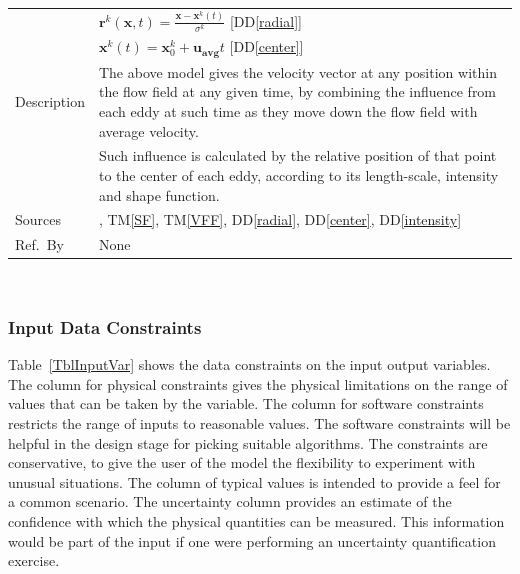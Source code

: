 \documentclass[12pt]{article}
\newcommand{\colAwidth}{0.13\textwidth}
\newcommand{\colBwidth}{0.82\textwidth}
\newcommand{\ddref}[1]{DD\ref{#1}}
\newcommand{\tref}[1]{TM\ref{#1}}
\begin{document}
\begin{minipage}{\textwidth}
\begin{tabular}{| p{\colAwidth} | p{\colBwidth}|}
  & $\mathbf{r}^k(\mathbf{x},t) = \frac{\mathbf{x}-\mathbf{x}^k(t)}{\sigma^k}$ [\ddref{radial}]\\
  & $\mathbf{x}^k(t) = \mathbf{x}^k_0 + \mathbf{u_\text{avg}}t$ [\ddref{center}]\\
  \hline
  Description
  & The above model gives the velocity vector at any position within the flow field at any given time, by combining the influence from each eddy at such time as they move down the flow field with average velocity.\\
  & Such influence is calculated by the relative position of that point to the center of each eddy, according to its length-scale, intensity and shape function.
  \\
  \hline
  Sources& \citet{PolettoEtAl2013}, \tref{SF}, \tref{VFF}, \ddref{radial}, \ddref{center}, \ddref{intensity}\\
  \hline
  Ref.\ By & None\\
  \hline
\end{tabular}
\end{minipage}\\




\subsubsection{Input Data Constraints} \label{sec_DataConstraints}    

Table~\ref{TblInputVar} shows the data constraints on the input output
variables.  The column for physical constraints gives the physical limitations
on the range of values that can be taken by the variable.  The column for
software constraints restricts the range of inputs to reasonable values.  The
software constraints will be helpful in the design stage for picking suitable
algorithms.  The constraints are conservative, to give the user of the model the
flexibility to experiment with unusual situations.  The column of typical values
is intended to provide a feel for a common scenario.  The uncertainty column
provides an estimate of the confidence with which the physical quantities can be
measured.  This information would be part of the input if one were performing an
uncertainty quantification exercise.
\end{document}
